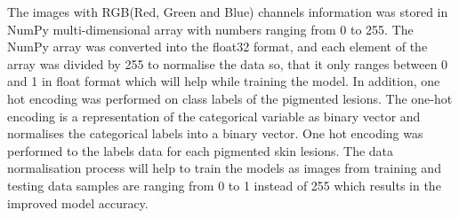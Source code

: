 The images with RGB(Red, Green and Blue) channels information was stored in NumPy multi-dimensional array with numbers ranging from 0 to 255.
The NumPy array was converted into the float32 format, and each element of the array was divided by 255 to normalise the data so, that it only ranges between 0 and 1 in float format which will help while training the model. In addition, one hot encoding was performed on class labels of the pigmented lesions. The one-hot encoding is a representation of the categorical variable as binary vector and normalises the categorical labels into a binary vector. One hot encoding was performed to the labels data for each pigmented skin lesions. The data normalisation process will help to train the models as images 
from training and testing data samples are ranging from 0 to 1 instead of 255 which results in 
the improved model accuracy.